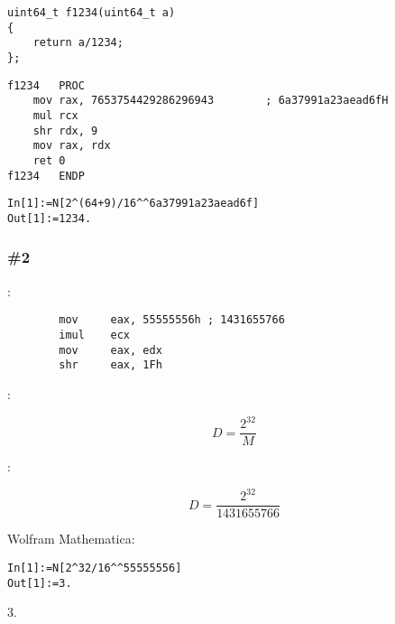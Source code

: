 \begin{lstlisting}
uint64_t f1234(uint64_t a)
{
	return a/1234;
};
\end{lstlisting}

\begin{lstlisting}[caption=MSVC 2012 x64 /Ox]
f1234	PROC
	mov	rax, 7653754429286296943		; 6a37991a23aead6fH
	mul	rcx
	shr	rdx, 9
	mov	rax, rdx
	ret	0
f1234	ENDP
\end{lstlisting}

\begin{lstlisting}[caption=Wolfram Mathematica]
In[1]:=N[2^(64+9)/16^^6a37991a23aead6f]
Out[1]:=1234.
\end{lstlisting}

\subsubsection{ \#2}

:

\begin{lstlisting}
		mov     eax, 55555556h ; 1431655766
		imul    ecx
		mov     eax, edx
		shr     eax, 1Fh
\end{lstlisting}

:

\[
D=\frac{2^{32}}{M}
\]

:

\[
D=\frac{2^{32}}{1431655766}
\]

 Wolfram Mathematica:

\begin{lstlisting}[caption=Wolfram Mathematica]
In[1]:=N[2^32/16^^55555556]
Out[1]:=3.
\end{lstlisting}

 3.


